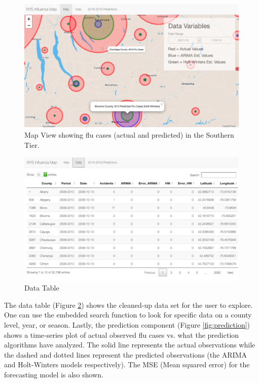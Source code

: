 \documentclass[12pt]{article}
\begin{document}
\begin{figure}[H]
\centering
\includegraphics{Picture1.png}
\caption{Map View showing flu cases (actual and predicted) in the Southern Tier.}
\label{fig:flu-cases}
\end{figure}

\begin{figure}[H]
\centering
\includegraphics{Picture2.png}
\caption{Data Table}
\label{fig:data-table}
\end{figure}

The data table (Figure \ref{fig:data-table}) shows the cleaned-up data set for the user to explore. One can use the embedded search function to look for specific data on a county level, year, or season. Lastly, the prediction component (Figure \ref{fig:prediction}) shows a time-series plot of actual observed flu cases vs. what the prediction algorithms have analyzed. The solid line represents the actual observations while the dashed and dotted lines represent the predicted observations (the ARIMA and Holt-Winters models respectively). The MSE (Mean squared error) for the forecasting model is also shown.
\end{document}
